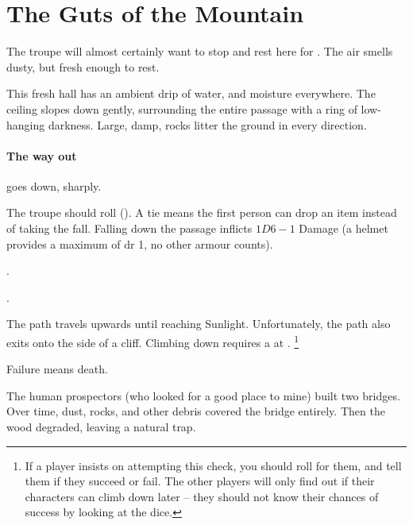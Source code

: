\section{The Guts of the Mountain}

\begin{multicols}{2}


The troupe will almost certainly want to stop and rest here for .
The air smells dusty, but fresh enough to rest.

\begin{boxtext}
  This fresh hall has an ambient drip of water, and moisture everywhere.
  The ceiling slopes down gently, surrounding the entire passage with a ring of low-hanging darkness.
  Large, damp, rocks litter the ground in every direction.
\end{boxtext}

\paragraph{The way out}
goes down, sharply.

The troupe should roll  (\tn[10]).
A tie means the first person can drop an item instead of taking the fall.
Falling down the passage inflicts $1D6-1$ Damage (a helmet provides a maximum of \gls{dr} 1, no other armour counts).

.

.


The path travels upwards until reaching Sunlight.
Unfortunately, the path also exits onto the side of a cliff.
Climbing down requires a  at \tn[14].%
\footnote{If a player insists on attempting this check, you should roll for them, and tell them if they succeed or fail.  The other players will only find out if their characters can climb down later -- they should not know their chances of success by looking at the dice.}

Failure means death.


\begin{exampletext}
  The human prospectors (who looked for a good place to mine) built two bridges.
  Over time, dust, rocks, and other debris covered the bridge entirely.
  Then the wood degraded, leaving a natural trap.


\end{exampletext}
\end{multicols}

